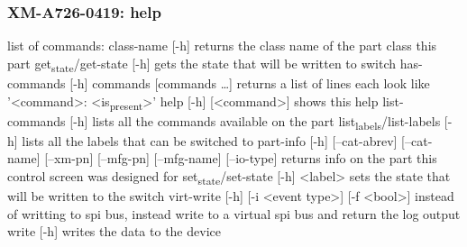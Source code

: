 \documentclass[11pt]{article}
\begin{document}
\subsubsection{XM-A726-0419: help}
\label{sec:orge5e77f2}
list of commands:
  class-name [-h]
    returns the class name of the part class this part
  get\textsubscript{state}/get-state [-h]
    gets the state that will be written to switch
  has-commands [-h] commands [commands \ldots{}]
    returns a list of lines each look like '<command>: <is\textsubscript{present}>'
  help [-h] [<command>]
    shows this help
  list-commands [-h]
    lists all the commands available on the part
  list\textsubscript{labels}/list-labels [-h]
    lists all the labels that can be switched to
  part-info  [-h] [--cat-abrev] [--cat-name] [--xm-pn] [--mfg-pn] [--mfg-name]
          [--io-type]
    returns info on the part this control screen was designed for
  set\textsubscript{state}/set-state [-h] <label>
    sets the state that will be written to the switch
  virt-write [-h] [-i <event type>] [-f <bool>]
    instead of writting to spi bus, instead write to a virtual spi bus
    and return the log output
  write [-h]
    writes the data to the device
\end{document}
